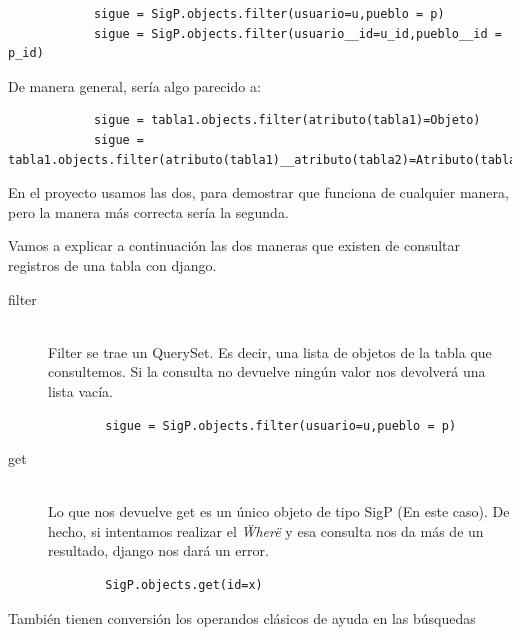 		\begin{lstlisting}
			sigue = SigP.objects.filter(usuario=u,pueblo = p)
			sigue = SigP.objects.filter(usuario__id=u_id,pueblo__id = p_id)
		\end{lstlisting}

De manera general, sería algo parecido a:

		\begin{lstlisting}
			sigue = tabla1.objects.filter(atributo(tabla1)=Objeto)
			sigue = tabla1.objects.filter(atributo(tabla1)__atributo(tabla2)=Atributo(tabla2))
		\end{lstlisting}

En el proyecto usamos las dos, para demostrar que funciona de cualquier manera, pero la manera más correcta sería la segunda.

Vamos a explicar a continuación las dos maneras que existen de consultar registros de una tabla con django.
\begin{description}
  \item[filter] \hfill \\
  	Filter se trae un QuerySet. Es decir, una lista de objetos de la tabla que consultemos. Si la consulta no devuelve ningún valor nos devolverá una lista vacía.
	\begin{lstlisting}
		sigue = SigP.objects.filter(usuario=u,pueblo = p)
	\end{lstlisting}
	

  \item[get] \hfill \\
  Lo que nos devuelve get es un único objeto de tipo SigP (En este caso). De hecho, si intentamos realizar el \textit{\"Where\"} y esa consulta nos da más de un resultado, django nos dará un error.
	\begin{lstlisting}
		SigP.objects.get(id=x)
	\end{lstlisting}
\end{description}

También tienen conversión los operandos clásicos de ayuda en las búsquedas

